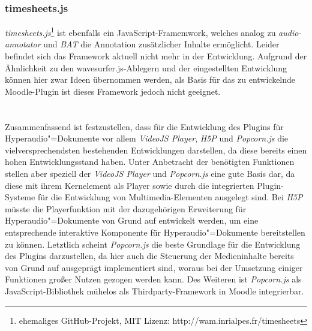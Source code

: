 \subsubsection{timesheets.js}
\textit{timesheets.js}\footnote{ehemaliges GitHub-Projekt, MIT Lizenz: http://wam.inrialpes.fr/timesheets} ist ebenfalls ein JavaScript-Framemwork, welches analog zu \textit{audio-annotator} und \textit{BAT} die Annotation zusätzlicher Inhalte ermöglicht. Leider befindet sich das Framework aktuell nicht mehr in der Entwicklung. Aufgrund der Ähnlichkeit zu den {wavesurfer.js}-Ablegern und der eingestellten Entwicklung können hier zwar Ideen übernommen werden, als Basis für das zu entwickelnde Moodle-Plugin ist dieses Framework jedoch nicht geeignet.
\\\\\\
Zusammenfassend ist festzustellen, dass für die Entwicklung des Plugins für Hyperaudio"=Dokumente vor allem \textit{VideoJS Player}, \textit{H5P} und \textit{Popcorn.js} die vielversprechendsten bestehenden Entwicklungen darstellen, da diese bereits einen hohen Entwicklungsstand haben. Unter Anbetracht der benötigten Funktionen stellen aber speziell der \textit{VideoJS Player} und \textit{Popcorn.js} eine gute Basis dar, da diese mit ihrem Kernelement als Player sowie durch die integrierten Plugin-Systeme für die Entwicklung von Multimedia-Elementen ausgelegt sind. Bei \textit{H5P} müsste die Playerfunktion mit der dazugehörigen Erweiterung für Hyperaudio"=Dokumente von Grund auf entwickelt werden, um eine entsprechende interaktive Komponente für Hyperaudio"=Dokumente bereitstellen zu können. Letztlich scheint \textit{Popcorn.js} die beste Grundlage für die Entwicklung des Plugins darzustellen, da hier auch die Steuerung der Medieninhalte bereits von Grund auf ausgeprägt implementiert sind, woraus bei der Umsetzung einiger Funktionen großer Nutzen gezogen werden kann. Des Weiteren ist \textit{Popcorn.js} als JavaScript-Bibliothek mühelos als Thirdparty-Framework in Moodle integrierbar.


